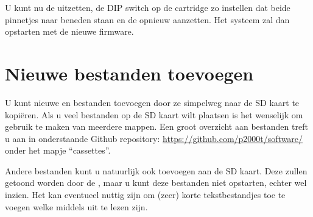 U kunt nu de  uitzetten, de DIP switch op de  cartridge zo instellen dat beide pinnetjes naar beneden staan en de  opnieuw aanzetten. Het systeem zal dan opstarten met de nieuwe firmware.

%
%
%
\section{Nieuwe bestanden toevoegen}


U kunt nieuwe \cas en  bestanden toevoegen door ze simpelweg naar de SD kaart te kopiëren. Als u veel bestanden op de SD kaart wilt plaatsen is het wenselijk om gebruik te maken van meerdere mappen. Een groot overzicht aan \cas bestanden treft u aan in onderstaande Github repository: \url{https://github.com/p2000t/software/}
onder het mapje ``cassettes''.


Andere bestanden kunt u natuurlijk ook toevoegen aan de SD kaart. Deze zullen getoond worden door de \product, maar u kunt deze bestanden niet opstarten, echter wel inzien. Het kan eventueel nuttig zijn om (zeer) korte tekstbestandjes toe te voegen welke middels  uit te lezen zijn.